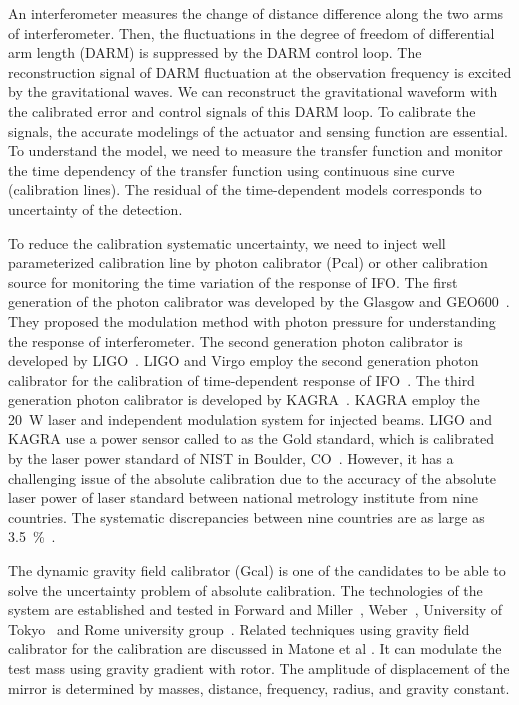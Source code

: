 \documentclass[%
 reprint,
superscriptaddress,
 amsmath,amssymb,
 aps,
]{revtex4-1}
\begin{document}

An interferometer measures the change of distance difference along the two arms of interferometer. Then, the fluctuations in the degree of freedom of differential arm length (DARM) is suppressed by the DARM control loop. The reconstruction signal of DARM fluctuation at the observation frequency is excited by the gravitational waves. We can reconstruct the gravitational waveform with the calibrated error and control signals of this DARM loop. To calibrate the signals, the accurate modelings of the actuator and sensing function are essential. To understand the model, we need to measure the transfer function and monitor the time dependency of the transfer function using continuous sine curve (calibration lines). The residual of the time-dependent models corresponds to uncertainty of the detection.

To reduce the calibration systematic uncertainty, we need to inject well parameterized calibration line by photon calibrator (Pcal) or other calibration source for monitoring the time variation of the response of IFO. The first generation of the photon calibrator was developed by the Glasgow and GEO600~\cite{CLUBLEY200185,MOSSAVI20061}. They proposed the modulation method with photon pressure for understanding the response of interferometer. The second generation photon calibrator is developed by LIGO~\cite{doi:10.1063/1.4967303,0264-9381-27-8-084024,0264-9381-26-24-245011,0264-9381-32-2-024001}. LIGO and Virgo employ the second generation photon calibrator for the calibration of time-dependent response of IFO~\cite{0264-9381-32-2-024001}. The third generation photon calibrator is developed by KAGRA~\cite{KAGRA_Pcal}. KAGRA employ the 20~W laser and independent modulation system for injected beams. LIGO and KAGRA use a power sensor called to as the Gold standard, which is calibrated by the laser power standard of NIST in Boulder, CO~\cite{taylor:1994:GEEU}. However, it has a challenging issue of the absolute calibration due to the accuracy of the absolute laser power of laser standard between national metrology institute from nine countries. The 
systematic discrepancies between nine countries are as large as 3.5~\%~\cite{EUROMET}.

The dynamic gravity field calibrator (Gcal) is one of the candidates to be able to solve the uncertainty problem of absolute calibration. The technologies of the system are established and tested in Forward and Miller~\cite{doi:10.1063/1.1709366}, Weber~\cite{PhysRevLett.18.795,PhysRev.167.1145}, University of Tokyo~\cite{Hirakawa,1347-4065-19-3-L123,1347-4065-20-7-L498,PhysRevD.26.729,PhysRevD.32.342} and Rome university group~\cite{Astone1991}. Related techniques using gravity field calibrator for the calibration are discussed in Matone et al \cite{0264-9381-24-9-005}. It can modulate the test mass using gravity gradient with rotor. The amplitude of displacement of the mirror is determined by masses, distance, frequency, radius, and gravity constant. 
\end{document}

